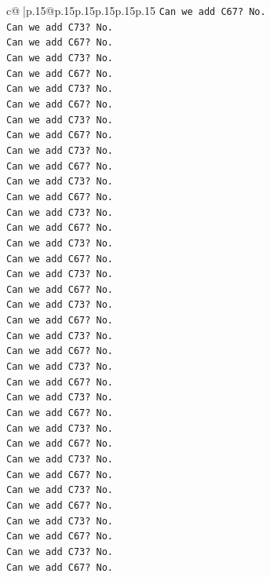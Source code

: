 \documentclass{article}
\begin{document}
{\begin{supertabular}{c@{$\;$}|p{.15\linewidth}@{}p{.15\linewidth}p{.15\linewidth}p{.15\linewidth}p{.15\linewidth}p{.15\linewidth}}
{{{\texttt{Can we add C67? No.} \\
\texttt{Can we add C73? No.} \\
\texttt{Can we add C67? No.} \\
\texttt{Can we add C73? No.} \\
\texttt{Can we add C67? No.} \\
\texttt{Can we add C73? No.} \\
\texttt{Can we add C67? No.} \\
\texttt{Can we add C73? No.} \\
\texttt{Can we add C67? No.} \\
\texttt{Can we add C73? No.} \\
\texttt{Can we add C67? No.} \\
\texttt{Can we add C73? No.} \\
\texttt{Can we add C67? No.} \\
\texttt{Can we add C73? No.} \\
\texttt{Can we add C67? No.} \\
\texttt{Can we add C73? No.} \\
\texttt{Can we add C67? No.} \\
\texttt{Can we add C73? No.} \\
\texttt{Can we add C67? No.} \\
\texttt{Can we add C73? No.} \\
\texttt{Can we add C67? No.} \\
\texttt{Can we add C73? No.} \\
\texttt{Can we add C67? No.} \\
\texttt{Can we add C73? No.} \\
\texttt{Can we add C67? No.} \\
\texttt{Can we add C73? No.} \\
\texttt{Can we add C67? No.} \\
\texttt{Can we add C73? No.} \\
\texttt{Can we add C67? No.} \\
\texttt{Can we add C73? No.} \\
\texttt{Can we add C67? No.} \\
\texttt{Can we add C73? No.} \\
\texttt{Can we add C67? No.} \\
\texttt{Can we add C73? No.} \\
\texttt{Can we add C67? No.} \\
\texttt{Can we add C73? No.} \\
\texttt{Can we add C67? No.} \\
}}}
\end{supertabular}}
\end{document}
